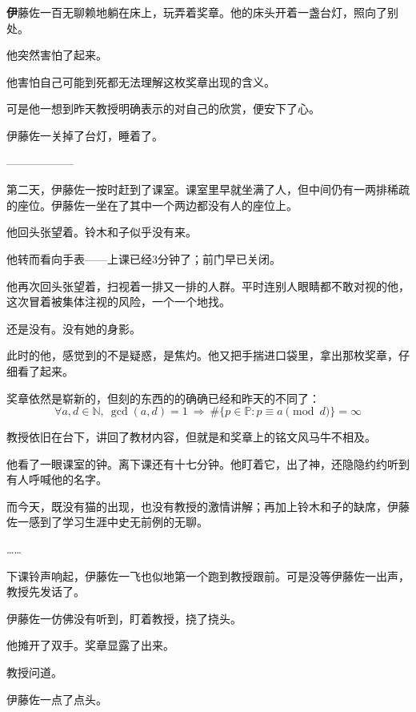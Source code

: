 
\AddSymbolsB 
\pagecolor{cyan!10!gray}
\color{white}
\quad\quad \lettrine[,lraise=0.2,lhang=0.5]{\textbf{伊}}{藤}佐一百无聊赖地躺在床上，玩弄着奖章。他的床头开着一盏台灯，照向了别处。

他突然害怕了起来。

他害怕自己可能到死都无法理解这枚奖章出现的含义。

可是他一想到昨天教授明确表示的对自己的欣赏，便安下了心。

伊藤佐一关掉了台灯，睡着了。

\begin{center}
——————
\end{center}

第二天，伊藤佐一按时赶到了课室。课室里早就坐满了人，但中间仍有一两排稀疏的座位。伊藤佐一坐在了其中一个两边都没有人的座位上。

他回头张望着。铃木和子似乎没有来。

他转而看向手表——上课已经3分钟了；前门早已关闭。

他再次回头张望着，扫视着一排又一排的人群。平时连别人眼睛都不敢对视的他，这次冒着被集体注视的风险，一个一个地找。

还是没有。没有她的身影。

此时的他，感觉到的不是疑惑，是焦灼。他又把手揣进口袋里，拿出那枚奖章，仔细看了起来。

奖章依然是崭新的，但刻的东西的的确确已经和昨天的不同了：
\[
\forall a,d\in\mathbb{N},\ \gcd(a,d)=1\ \Rightarrow\ \#\{p\in\mathbb{P}:p\equiv a\pmod d\}=\infty
\]

教授依旧在台下，讲回了教材内容，但就是和奖章上的铭文风马牛不相及。

他看了一眼课室的钟。离下课还有十七分钟。他盯着它，出了神，还隐隐约约听到有人呼喊他的名字。

而今天，既没有猫的出现，也没有教授的激情讲解；再加上铃木和子的缺席，伊藤佐一感到了学习生涯中史无前例的无聊。

……

下课铃声响起，伊藤佐一飞也似地第一个跑到教授跟前。可是没等伊藤佐一出声，教授先发话了。


伊藤佐一仿佛没有听到，盯着教授，挠了挠头。

他摊开了双手。奖章显露了出来。

教授问道。

伊藤佐一点了点头。

